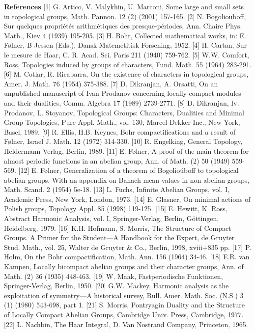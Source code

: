 \documentclass[12pt]{article}
\begin{document}
\textbf{References}
[1] G. Artico, V. Malykhin, U. Marconi, Some large and small sets in topological groups, Math. Pannon. 12 (2) (2001) 157-165.
[2] N. Bogoliouboff, Sur quelques propriétés arithmétiques des presque-périodes, Ann. Chaire Phys. Math., Kiev 4 (1939) 195-205.
[3] H. Bohr, Collected mathematical works, in: E. Følner, B Jessen (Eds.), Dansk Matemetitisk Forsening, 1952.
[4] H. Cartan, Sur le mesure de Haar, C. R. Acad. Sci. Paris 211 (1940) 759-762.
[5] W.W. Comfort, Ross, Topologies induced by groups of characters, Fund. Math. 55 (1964) 283-291.
[6] M. Cotlar, R. Ricabarra, On the existence of characters in topological groups, Amer. J. Math. 76 (1954) 375-388.
[7] D. Dikranjan, A. Orsatti, On an unpublished manuscript of Ivan Prodanov concerning locally compact modules and their dualities, Comm. Algebra 17
(1989) 2739-2771.
[8] D. Dikranjan, Iv. Prodanov, L. Stoyanov, Topological Groups: Characters, Dualities and Minimal Group Topologies, Pure Appl. Math., vol. 130, Marcel
Dekker Inc., New York, Basel, 1989.
[9] R. Ellis, H.B. Keynes, Bohr compactifications and a result of Følner, Israel J. Math. 12 (1972) 314-330.
[10] R. Engelking, General Topology, Heldermann Verlag, Berlin, 1989.
[11] E. Følner, A proof of the main theorem for almost periodic functions in an abelian group, Ann. of Math. (2) 50 (1949) 559-569.
[12] E. Følner, Generalization of a theorem of Bogolioúboff to topological abelian groups. With an appendix on Banach mean values in non-abelian groups,
Math. Scand. 2 (1954) 5e-18.
[13] L. Fuchs, Infinite Abelian Groups, vol. I, Academic Press, New York, London, 1973.
[14] E. Glasner, On minimal actions of Polish groups, Topology Appl. 85 (1998) 119-125.
[15] E. Hewitt, K. Ross, Abstract Harmonic Analysis, vol. I, Springer-Verlag, Berlin, Göttingen, Heidelberg, 1979.
[16] K.H. Hofmann, S. Morris, The Structure of Compact Groups. A Primer for the Student—A Handbook for the Expert, de Gruyter Stud. Math., vol. 25,
Walter de Gruyter & Co., Berlin, 1998, xviii+835 pp.
[17] P. Holm, On the Bohr compactification, Math. Ann. 156 (1964) 34-46.
[18] E.R. van Kampen, Locally bicompact abelian groups and their character groups, Ann. of Math. (2) 36 (1935) 448-463.
[19] W. Maak, Fastperiodische Funktionen, Springer-Verlag, Berlin, 1950.
[20] G.W. Mackey, Harmonic analysis as the exploitation of symmetry—A historical survey, Bull. Amer. Math. Soc. (N.S.) 3 (1) (1980) 543-698, part 1.
[21] S. Morris, Pontryagin Duality and the Structure of Locally Compact Abelian Groups, Cambridge Univ. Press, Cambridge, 1977.
[22] L. Nachbin, The Haar Integral, D. Van Nostrand Company, Princeton, 1965.
\end{document}
